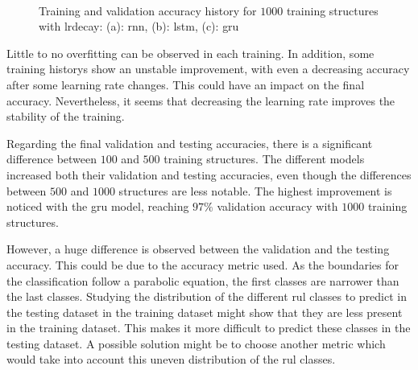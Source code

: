 \documentclass[conference]{IEEEtran}
\begin{document}
\begin{figure}[htp]
	\centering
	\quad
	\\
	\caption{Training and validation accuracy history for $ 1000 $ training structures with \gls{lrdecay}: (a): \gls{rnn}, (b): \gls{lstm}, (c): \gls{gru}}
	\label{fig:accuracy_1000_structures_fine_tuning_rnn}
\end{figure}

Little to no overfitting can be observed in each training. In addition, some training historys show an unstable improvement, with even a decreasing accuracy after some learning rate changes. This could have an impact on the final accuracy. Nevertheless, it seems that decreasing the learning rate improves the stability of the training.

Regarding the final validation and testing accuracies, there is a significant difference between $ 100 $ and $ 500 $ training structures. The different models increased both their validation and testing accuracies, even though the differences between $ 500 $ and $ 1000 $ structures are less notable. The highest improvement is noticed with the \gls{gru} model, reaching $ 97 \% $ validation accuracy with $ 1000 $ training structures.

However, a huge difference is observed between the validation and the testing accuracy. This could be due to the accuracy metric used. As the boundaries for the classification follow a parabolic equation, the first classes are narrower than the last classes. Studying the distribution of the different \gls{rul} classes to predict in the testing dataset in the training dataset might show that they are less present in the training dataset. This makes it more difficult to predict these classes in the testing dataset. A possible solution might be to choose another metric which would take into account this uneven distribution of the \gls{rul} classes.
\end{document}
